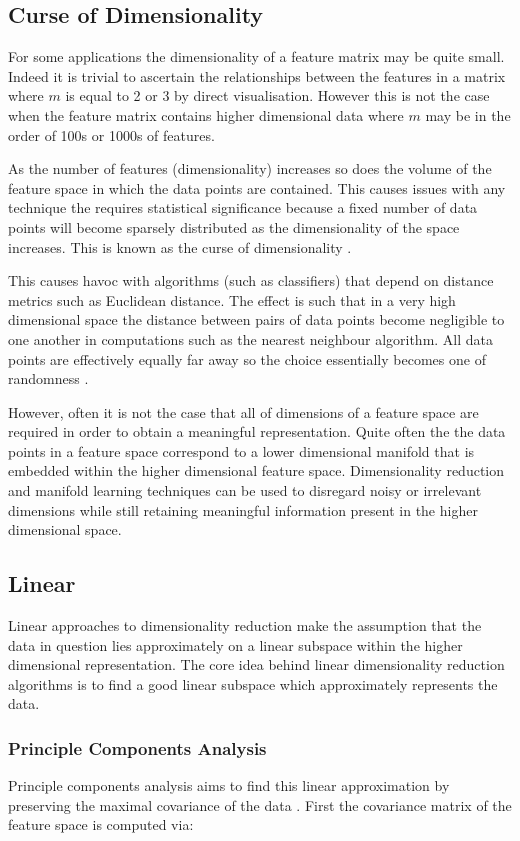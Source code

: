 \subsection{Curse of Dimensionality}
For some applications the dimensionality of a feature matrix may be quite small. Indeed it is trivial to ascertain the relationships between the features in a matrix where $m$ is equal to 2 or 3 by direct visualisation. However this is not the case when the feature matrix contains higher dimensional data where $m$ may be in the order of 100s or 1000s of features.

As the number of features (dimensionality) increases so does the volume of the feature space in which the data points are contained. This causes issues with any technique the requires statistical significance because a fixed number of data points will become sparsely distributed as the dimensionality of the space increases. This is known as the curse of dimensionality \cite{bellman1965dynamic}.

This causes havoc with algorithms (such as classifiers) that depend on distance metrics such as Euclidean distance. The effect is such that in a very high dimensional space the distance between pairs of data points become negligible to one another in computations such as the nearest neighbour algorithm. All data points are effectively equally far away so the choice essentially becomes one of randomness \cite{domingos2012few}. 

However, often it is not the case that all of dimensions of a feature space are required in order to obtain a meaningful representation. Quite often the the data points in a feature space correspond to a lower dimensional manifold that is embedded within the higher dimensional feature space. Dimensionality reduction and manifold learning techniques can be used to disregard noisy or irrelevant dimensions while still retaining meaningful information present in the higher dimensional space.

\subsection{Linear}
Linear approaches to dimensionality reduction make the assumption that the data in question lies approximately on a linear subspace within the higher dimensional representation. The core idea behind linear dimensionality reduction algorithms is to find a good linear subspace which approximately represents the data.

\subsubsection{Principle Components Analysis}
Principle components analysis aims to find this linear approximation by preserving the maximal covariance of the data \cite{strange2014open}. First the covariance matrix of the feature space is computed via:

